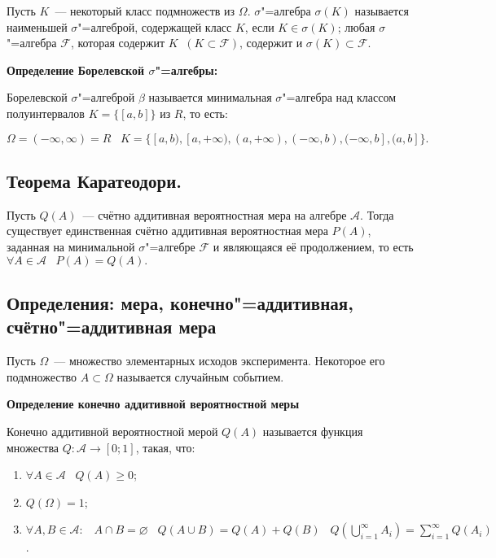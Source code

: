     Пусть $K$~--- некоторый класс подмножеств из $\Omega$. $\sigma$"=алгебра
    $\sigma(K)$ называется наименьшей $\sigma$"=алгеброй, содержащей
    класс $K$, если $K \in \sigma(K)$; любая $\sigma$"=алгебра $\mathcal{F}$,
    которая содержит $K \;\; (K \subset \mathcal{F})$, содержит и 
    $\sigma(K) \subset \mathcal{F}$.
    \bigskip

\textbf{Определение Борелевской $\sigma$"=алгебры:}
    \smallskip
    
    Борелевской $\sigma$"=алгеброй $\beta$ называется минимальная $\sigma$"=алгебра
    над классом полуинтервалов $K = \{[a, b]\}$ из $R$, то есть:

    \[
        \Omega = (-\infty, \infty) = R \;\;\; K = \{[a, b), [a, +\infty),
        (a, +\infty), (-\infty, b), (-\infty, b], (a, b]\}.  
    \]
    \bigskip

\subsection{Теорема Каратеодори.}

    Пусть $Q(A)$~--- счётно аддитивная вероятностная мера на алгебре $\mathcal{A}$.
    Тогда существует единственная счётно аддитивная вероятностная мера $P(A)$, заданная
    на минимальной $\sigma$"=алгебре $\mathcal{F}$ и являющаяся её продолжением,
    то есть $\forall A \in \mathcal{A} \;\;\; P(A) = Q(A).$
    \bigskip

\subsection{Определения: мера, конечно"=аддитивная, счётно"=аддитивная мера}

Пусть $\Omega$~--- множество элементарных исходов эксперимента. Некоторое 
его подмножество $A \subset \Omega$ называется случайным событием.
\bigskip

\textbf{Определение конечно аддитивной
вероятностной меры}
    \smallskip

    Конечно аддитивной вероятностной мерой $Q(A)$
    называется функция множества $Q: \mathcal{A}
    \rightarrow [0; 1]$, такая, что:

    \begin{enumerate}
        \item{$\forall A \in \mathcal{A} \;\;\;
        Q(A) \geq 0$;}
        \item{$Q(\Omega) = 1$;}
        \item{$\forall A, B \in \mathcal{A} : 
        \;\;\; A \cap B = \varnothing \;\;\;
        Q(A \cup B) = Q(A) + Q(B) \;\;\;
        Q\left(\bigcup\limits_{i = 1}^{\infty} A_i\right) = \sum_{i = 1}^{\infty}
        Q(A_i)$.}
    \end{enumerate}
    \bigskip  


